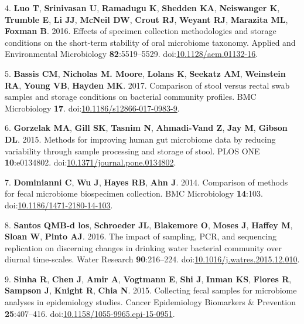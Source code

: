 \documentclass[11pt,]{article}
\begin{document}
\leavevmode\hypertarget{ref-Luo2016}{}%
4. \textbf{Luo T}, \textbf{Srinivasan U}, \textbf{Ramadugu K},
\textbf{Shedden KA}, \textbf{Neiswanger K}, \textbf{Trumble E},
\textbf{Li JJ}, \textbf{McNeil DW}, \textbf{Crout RJ}, \textbf{Weyant
RJ}, \textbf{Marazita ML}, \textbf{Foxman B}. 2016. Effects of specimen
collection methodologies and storage conditions on the short-term
stability of oral microbiome taxonomy. Applied and Environmental
Microbiology \textbf{82}:5519--5529.
doi:\href{https://doi.org/10.1128/aem.01132-16}{10.1128/aem.01132-16}.

\leavevmode\hypertarget{ref-Bassis2017}{}%
5. \textbf{Bassis CM}, \textbf{Nicholas M. Moore}, \textbf{Lolans K},
\textbf{Seekatz AM}, \textbf{Weinstein RA}, \textbf{Young VB},
\textbf{Hayden MK}. 2017. Comparison of stool versus rectal swab samples
and storage conditions on bacterial community profiles. BMC Microbiology
\textbf{17}.
doi:\href{https://doi.org/10.1186/s12866-017-0983-9}{10.1186/s12866-017-0983-9}.

\leavevmode\hypertarget{ref-Gorzelak2015}{}%
6. \textbf{Gorzelak MA}, \textbf{Gill SK}, \textbf{Tasnim N},
\textbf{Ahmadi-Vand Z}, \textbf{Jay M}, \textbf{Gibson DL}. 2015.
Methods for improving human gut microbiome data by reducing variability
through sample processing and storage of stool. PLOS ONE
\textbf{10}:e0134802.
doi:\href{https://doi.org/10.1371/journal.pone.0134802}{10.1371/journal.pone.0134802}.

\leavevmode\hypertarget{ref-Dominianni2014}{}%
7. \textbf{Dominianni C}, \textbf{Wu J}, \textbf{Hayes RB}, \textbf{Ahn
J}. 2014. Comparison of methods for fecal microbiome biospecimen
collection. BMC Microbiology \textbf{14}:103.
doi:\href{https://doi.org/10.1186/1471-2180-14-103}{10.1186/1471-2180-14-103}.

\leavevmode\hypertarget{ref-BautistadelosSantos2016}{}%
8. \textbf{Santos QMB-d los}, \textbf{Schroeder JL}, \textbf{Blakemore
O}, \textbf{Moses J}, \textbf{Haffey M}, \textbf{Sloan W}, \textbf{Pinto
AJ}. 2016. The impact of sampling, PCR, and sequencing replication on
discerning changes in drinking water bacterial community over diurnal
time-scales. Water Research \textbf{90}:216--224.
doi:\href{https://doi.org/10.1016/j.watres.2015.12.010}{10.1016/j.watres.2015.12.010}.

\leavevmode\hypertarget{ref-Sinha2015}{}%
9. \textbf{Sinha R}, \textbf{Chen J}, \textbf{Amir A}, \textbf{Vogtmann
E}, \textbf{Shi J}, \textbf{Inman KS}, \textbf{Flores R},
\textbf{Sampson J}, \textbf{Knight R}, \textbf{Chia N}. 2015. Collecting
fecal samples for microbiome analyses in epidemiology studies. Cancer
Epidemiology Biomarkers \& Prevention \textbf{25}:407--416.
doi:\href{https://doi.org/10.1158/1055-9965.epi-15-0951}{10.1158/1055-9965.epi-15-0951}.
\end{document}

